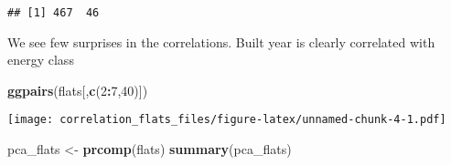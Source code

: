 \documentclass[
]{article}
\newenvironment{Shaded}{\begin{snugshade}}{\end{snugshade}}
\newcommand{\DecValTok}[1]{\textcolor[rgb]{0.00,0.00,0.81}{#1}}
\newcommand{\KeywordTok}[1]{\textcolor[rgb]{0.13,0.29,0.53}{\textbf{#1}}}
\newcommand{\NormalTok}[1]{#1}
\newcommand{\OperatorTok}[1]{\textcolor[rgb]{0.81,0.36,0.00}{\textbf{#1}}}
\newcommand{\StringTok}[1]{\textcolor[rgb]{0.31,0.60,0.02}{#1}}
\begin{document}
\begin{verbatim}
## [1] 467  46
\end{verbatim}

We see few surprises in the correlations. Built year is clearly
correlated with energy class

\begin{Shaded}
\begin{Highlighting}[]
\KeywordTok{ggpairs}\NormalTok{(flats[,}\KeywordTok{c}\NormalTok{(}\DecValTok{2}\OperatorTok{:}\DecValTok{7}\NormalTok{,}\DecValTok{40}\NormalTok{)])}
\end{Highlighting}
\end{Shaded}

\texttt{[image: correlation\_flats\_files/figure-latex/unnamed-chunk-4-1.pdf]}

\begin{Shaded}
\begin{Highlighting}[]
\NormalTok{pca_flats <-}\StringTok{ }\KeywordTok{prcomp}\NormalTok{(flats)}
\KeywordTok{summary}\NormalTok{(pca_flats)}
\end{Highlighting}
\end{Shaded}
\end{document}
